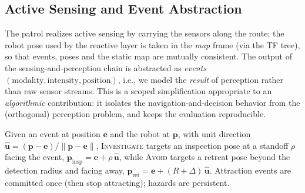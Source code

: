\subsection{Active Sensing and Event Abstraction}
\label{sec:method-sensing}
The patrol realizes active sensing by carrying the sensors along the route; the
robot pose used by the reactive layer is taken in the \emph{map} frame (via the
TF tree), so that events, poses and the static map are mutually consistent. The
output of the sensing-and-perception chain is abstracted as \emph{events}
$(\text{modality}, \text{intensity}, \text{position})$, i.e., we model the
\emph{result} of perception rather than raw sensor streams. This is a scoped
simplification appropriate to an \emph{algorithmic} contribution: it isolates
the navigation-and-decision behavior from the (orthogonal) perception problem,
and keeps the evaluation reproducible.

Given an event at position $\bm{e}$ and the robot at $\bm{p}$, with unit
direction $\hat{\bm{u}}=(\bm{p}-\bm{e})/\lVert\bm{p}-\bm{e}\rVert$,
\textsc{Investigate} targets an inspection pose at a standoff $\rho$ facing the
event, $\bm{p}_{\text{insp}}=\bm{e}+\rho\,\hat{\bm{u}}$, while \textsc{Avoid}
targets a retreat pose beyond the detection radius and facing away,
$\bm{p}_{\text{ret}}=\bm{e}+(R+\Delta)\,\hat{\bm{u}}$. Attraction events are
committed once (then stop attracting); hazards are persistent.
